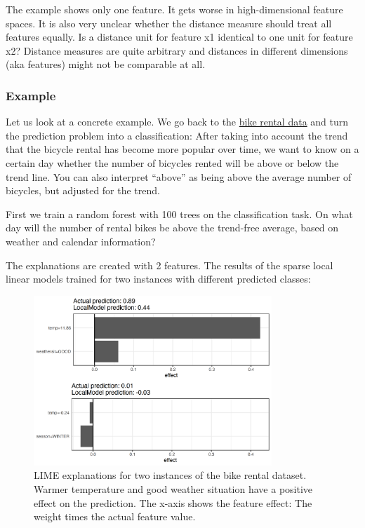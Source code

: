 \documentclass[
  11pt,
]{scrbook}
\begin{document}
The example shows only one feature.
It gets worse in high-dimensional feature spaces.
It is also very unclear whether the distance measure should treat all features equally.
Is a distance unit for feature x1 identical to one unit for feature x2?
Distance measures are quite arbitrary and distances in different dimensions (aka features) might not be comparable at all.

\hypertarget{example-5}{%
\subsubsection{Example}\label{example-5}}

Let us look at a concrete example.
We go back to the \protect\hyperlink{bike-data}{bike rental data} and turn the prediction problem into a classification:
After taking into account the trend that the bicycle rental has become more popular over time, we want to know on a certain day whether the number of bicycles rented will be above or below the trend line.
You can also interpret ``above'' as being above the average number of bicycles, but adjusted for the trend.

First we train a random forest with 100 trees on the classification task.
On what day will the number of rental bikes be above the trend-free average, based on weather and calendar information?

The explanations are created with 2 features.
The results of the sparse local linear models trained for two instances with different predicted classes:

\begin{figure}

{\centering \includegraphics[width=0.8\textwidth]{images/lime-tabular-example-explain-plot-1-1} 

}

\caption{LIME explanations for two instances of the bike rental dataset. Warmer temperature and good weather situation have a positive effect on the prediction. The x-axis shows the feature effect: The weight times the actual feature value.}\label{fig:lime-tabular-example-explain-plot-1}
\end{figure}
\end{document}
